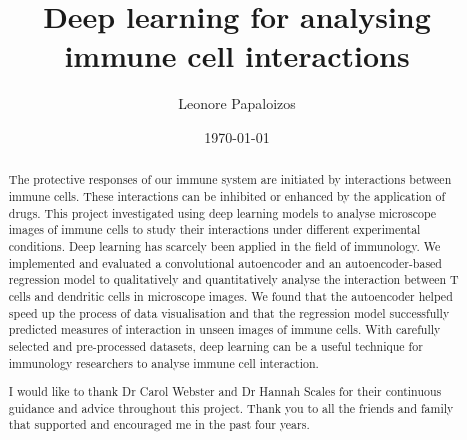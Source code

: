 \documentclass{l4proj}
\begin{document}
\title{Deep learning for analysing immune cell interactions}
\author{Leonore Papaloizos}
\date{\today}

\maketitle

\begin{abstract}
    The protective responses of our immune system are initiated by interactions between immune cells. These interactions can be inhibited or enhanced by the application of drugs. This project investigated using deep learning models to analyse microscope images of immune cells to study their interactions under different experimental conditions. Deep learning has scarcely been applied in the field of immunology. We implemented and evaluated a convolutional autoencoder and an autoencoder-based regression model to qualitatively and quantitatively analyse the interaction between T cells and dendritic cells in microscope images. We found that the autoencoder helped speed up the process of data visualisation and that the regression model successfully predicted measures of interaction in unseen images of immune cells. With carefully selected and pre-processed datasets, deep learning can be a useful technique for immunology researchers to analyse immune cell interaction.
\end{abstract}


%
%
\def\consentname {Leonore Papaloizos} %
\def\consentdate {\today} %
%
\educationalconsent


\renewcommand{\abstractname}{Acknowledgements}
\begin{abstract}
I would like to thank Dr Carol Webster and Dr Hannah Scales for their continuous guidance and advice throughout this project. Thank you to all the friends and family that supported and encouraged me in the past four years.
\end{abstract}
\end{document}

